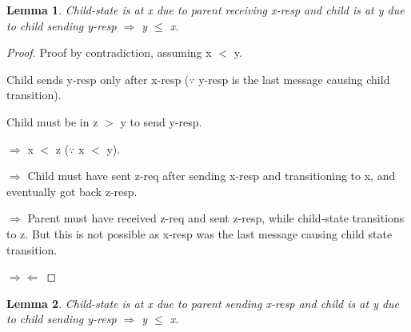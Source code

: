 \documentclass{article}
\newtheorem{lemma}{Lemma}
\begin{document}
\begin{lemma}
Child-state is at x due to parent receiving x-resp and child is at y due to child sending y-resp $\Rightarrow$ y $\le$ x.
\label{CSendPRecv<=}
\end{lemma}

\begin{proof}
Proof by contradiction, assuming x $<$ y.

\begin{figure}
\centering
\end{figure}

Child sends y-resp only after x-resp ($\because$ y-resp is the last message causing child transition).

Child must be in z $>$ y to send y-resp.

$\Rightarrow$ x $<$ z ($\because$ x $<$ y).

$\Rightarrow$ Child must have sent z-req after sending x-resp and transitioning to x, and eventually got back z-resp.

$\Rightarrow$ Parent must have received z-req and sent z-resp, while child-state transitions to z. But this is not possible as x-resp was the last message causing child state transition.

$\Rightarrow \Leftarrow$

\end{proof}

\begin{lemma}
Child-state is at x due to parent sending x-resp and child is at y due to child sending y-resp $\Rightarrow$ y $\le$ x.
\label{CSendPSend<=}
\end{lemma}
\end{document}
